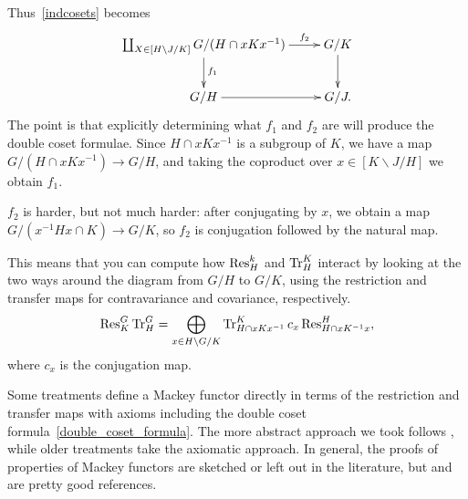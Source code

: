 Thus~\eqref{indcosets} becomes
\begin{equation}
\label{finalcsdiag}
\gathxy{
	\coprod_{X\in[H\backslash J/K]} G/(H\cap xKx^{-1})\ar[r]^-{f_2}\ar[d]^{f_1} & G/K\ar[d]\\
	G/H\ar[r] & G/J.
}
\end{equation}
The point is that explicitly determining what $f_1$ and $f_2$ are will produce the double coset formulae. Since
$H\cap xKx^{-1}$ is a subgroup of $K$, we have a map $G/(H\cap xKx^{-1})\to G/H$, and taking the coproduct over
$x\in[K\backslash J/H]$ we obtain $f_1$.

$f_2$ is harder, but not much harder: after conjugating by $x$, we obtain a map $G/(x^{-1}Hx\cap K)\to G/K$,
so $f_2$ is conjugation followed by the natural map.

This means that you can compute how $\operatorname{Res}_H^k$ and $\operatorname{Tr}_H^K$ interact by looking at the two ways around the
diagram from $G/H$ to $G/K$, using the restriction and transfer maps for contravariance and covariance,
respectively.
\begin{equation}
\label{double_coset_formula}
\operatorname{Res}_K^G\operatorname{Tr}_H^G = \bigoplus_{x\in H\backslash G/K} \operatorname{Tr}_{H\cap xKx^{-1}}^K c_x\operatorname{Res}_{H\cap xK^{-1}x}^H,
\end{equation}
where $c_x$ is the conjugation map.
\begin{rem}
Some treatments define a Mackey functor directly in terms of the restriction and transfer maps with axioms
including the double coset formula~\eqref{double_coset_formula}. The more abstract approach we took follows
\cite{Dress}, while older treatments take the axiomatic approach. In general, the proofs of properties of Mackey
functors are sketched or left out in the literature, but \cite{Webb} and  are pretty good
references.
\end{rem}
